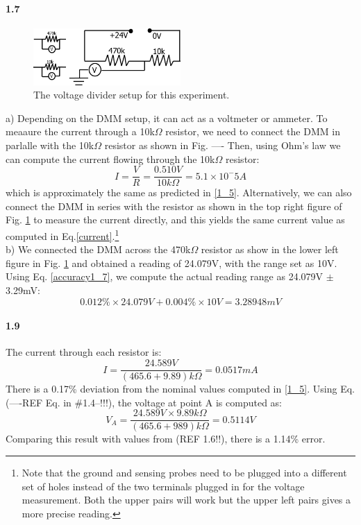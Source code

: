 \documentclass[authoryear, 12pt,5p, times]{elsarticle}
\begin{document}
\paragraph{\textbf{1.7}} 
\begin{figure}[h!]
\center
\includegraphics[width=0.5\textwidth]{figure/1_7_setup}
\caption{The voltage divider setup for this experiment.}
\label{voltage_divider}
\end{figure}
a) Depending on the DMM setup, it can act as a voltmeter or ammeter. To meaaure the current through a 10k$\Omega$ resistor, we need to connect the DMM in parlalle with the 10k$\Omega$ resistor as shown in Fig. ---- 
Then, using Ohm's law we can compute the current flowing through the 10k$\Omega$ resistor: 
\begin{equation}
I = \frac{V}{R}=\frac{0.510V}{10k\Omega}=5.1\times 10^-5 A
\label{current}
\end{equation}
which is approximately the same as predicted in \ref{1_5}. Alternatively, we can also connect the DMM in series with the resistor as shown in the top right figure of Fig. \ref{voltage_divider}  to measure the current directly, and this yields the same current value as computed in Eq.\ref{current}.\footnote{Note that the ground and sensing probes need to be plugged into a different set of holes instead of the two terminals plugged in for the voltage measurement. Both the upper pairs will work but the upper left pairs  gives a more precise reading.} 
\\
b)  We connected the DMM across the  470k$\Omega$ resistor as show in the lower left figure in Fig. \ref{voltage_divider} and obtained a reading of 24.079V, with the range set as 10V. Using Eq. \ref{accuracy1_7}, we compute the actual reading range as 24.079V $\pm $3.29mV:
\begin{equation}
0.012\% \times 24.079V+0.004\%\times 10V=3.28948mV
\label{accuracy1_7}
\end{equation}

\paragraph{\textbf{1.9}} 
The current through each resistor is: 
\begin{equation}
I = \frac{24.589V}{(465.6+9.89)k\Omega} = 0.0517mA
\end{equation}
There is a 0.17\% deviation from the nominal values computed in \ref{1_5}.
Using Eq. (----REF Eq. in \#1.4--!!!), the voltage at point A is computed as: 
\begin{equation}
V_A= \frac{24.589V \times 9.89k\Omega}{(465.6+989)k\Omega} = 0.5114V
\end{equation}
Comparing this result with values from (REF 1.6!!), there is a 1.14\% error.
\end{document}
